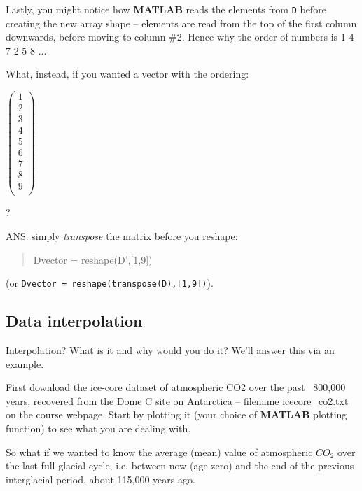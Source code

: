 \documentclass{tufte-book} %
\newenvironment{docspec}{\begin{quotation}\ttfamily\parskip0pt\parindent0pt\ignorespaces}{\end{quotation}}
\begin{document}
Lastly, you might notice how \textbf{MATLAB} reads the elements from \texttt{D} before creating the new array shape -- elements are read from the top of the first column downwards, before moving to column \#2. Hence why the order of numbers is 1  4  7  2  5  8 ... 

What, instead, if you wanted a vector with the ordering:

\vspace{2mm}
\(\begin{pmatrix}
1 \\
2 \\
3 \\
4 \\
5 \\
6 \\
7 \\
8 \\
9 \\
\end{pmatrix}\)
\vspace{4mm}

?

ANS: simply \textit{transpose} the matrix before you reshape:
\begin{docspec}
Dvector = reshape(D',[1,9])
\end{docspec}
(or \texttt{Dvector = reshape(transpose(D),[1,9])}).


\subsection{Data interpolation}

Interpolation? What is it and why would you do it? We'll answer this via an example. 

First download the ice-core dataset of atmospheric CO2 over the past ~800,000 years, recovered from the Dome C site on Antarctica -- filename \textsf{icecore\_co2.txt} on the course webpage. Start by plotting it (your choice of \textbf{MATLAB} plotting function) to see what you are dealing with.

So what if we wanted to know the average (mean) value of atmospheric \(CO_{2}\) over the last full glacial cycle, i.e. between now (age zero) and the end of the previous interglacial period, about 115,000 years ago.
\end{document}
